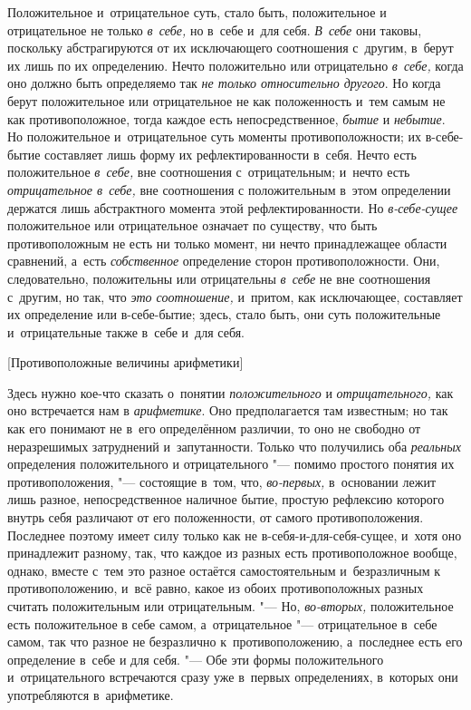 Положительное и~отрицательное суть, стало быть, положительное и
отрицательное не только {\em в~себе,} но в~себе и~для
себя. {\em В~себе} они таковы, поскольку абстрагируются
от их исключающего соотношения с~другим, в~берут их лишь по их определению.
Нечто положительно или отрицательно {\em в~себе,} когда
оно должно быть определяемо так {\em не только
относительно другого}. Но когда берут положительное или отрицательное не
как положенность и~тем самым не как противоположное, тогда каждое есть
непосредственное, {\em бытие} и
{\em небытие}. Но положительное и~отрицательное суть
моменты противоположности; их в-себе-бытие составляет лишь форму их
рефлектированности в~себя. Нечто есть положительное
{\em в~себе,} вне соотношения с~отрицательным; и~нечто
есть {\em отрицательное в~себе,} вне соотношения с
положительным
в~этом определении держатся лишь абстрактного момента этой
рефлектированности. Но {\em в-себе-сущее} положительное
или отрицательное означает по существу, что быть противоположным не есть ни
только момент, ни нечто принадлежащее области сравнений, а~есть
{\em собственное} определение сторон противоположности.
Они, следовательно, положительны или отрицательны
{\em в~себе} не вне соотношения с~другим, но так, что
{\em это соотношение,} и~притом, как исключающее,
составляет их определение или в-себе-бытие; здесь, стало быть, они суть
положительные и~отрицательные также в~себе и~для себя.

%
  {[Противоположные величины арифметики]}

Здесь нужно кое-что сказать о~понятии {\em положительного} и
{\em отрицательного,} как оно встречается нам в
{\em арифметике}. Оно предполагается там известным; но
так как его понимают не в~его определённом различии, то оно не свободно от
неразрешимых затруднений и~запутанности. Только что получились оба
{\em реальных} определения положительного и
отрицательного "--- помимо простого понятия их противоположения,
"--- состоящие в~том, что, {\em во-первых,} в~основании лежит лишь
разное, непосредственное наличное бытие, простую рефлексию которого внутрь
себя различают от его положенности, от самого противоположения. Последнее
поэтому имеет силу только как не в-себя-и-для-себя-сущее, и~хотя оно
принадлежит разному, так, что каждое из разных есть противоположное вообще,
однако, вместе с~тем это разное остаётся самостоятельным и~безразличным к
противоположению, и~всё равно, какое из обоих противоположных разных
считать положительным или отрицательным. "--- Но,
{\em во-вторых,} положительное есть положительное в
себе самом, а~отрицательное "--- отрицательное в~себе самом, так что разное не
безразлично к~противоположению, а~последнее есть его определение в~себе и
для себя. "--- Обе эти формы положительного и~отрицательного встречаются сразу
уже в~первых определениях, в~которых они употребляются в~арифметике.


